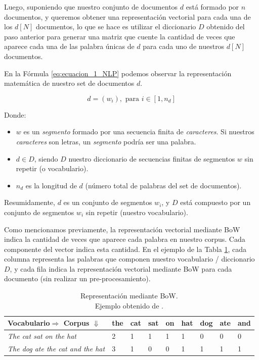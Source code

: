 \documentclass[12pt,a4paper]{article}
\begin{document}
\begin{sloppypar}
Luego, suponiendo que nuestro conjunto de documentos $d$  está formado por $n$ documentos, y queremos obtener una representación vectorial para cada una de los $d[N]$ documentos, lo que se hace es utilizar el diccionario $D$ obtenido del paso anterior para generar una matriz que cuente la cantidad de veces que aparece cada una de las palabra únicas de $d$ para cada uno de nuestros $d[N]$ documentos.

En la Fórmula \ref{eq:ecuacion_1_NLP} podemos observar la representación matemática de nuestro set de documentos  $d$.

\begin{equation}\label{eq:ecuacion_1_NLP}
d = (w_i),      \text{    para  } i\in[1,n_d] 
\end{equation}

Donde:
\begin{itemize}
\item $w$ es un \textit{segmento} formado por una secuencia finita de \textit{caracteres}. Si nuestros \textit{caracteres} son letras, un \textit{segmento} podría ser una palabra.
\item $d \in D$, siendo $D$ nuestro diccionario de secuencias finitas de segmentos $w$ sin repetir (o vocabulario). 
\item $n_d$ es la longitud de $d$ (número total de palabras del set de documentos).
\end{itemize}

Resumidamente, $d$ es un conjunto de segmentos $w_i$, y $D$ está compuesto por un conjunto de segmentos $w_i$ sin repetir (nuestro vocabulario).

\cleardoublepage

Como mencionamos previamente, la representación vectorial mediante BoW indica la cantidad de veces que aparece cada palabra en nuestro corpus. Cada componente del vector indica esta cantidad. En el ejemplo de la Tabla \ref{table:bow_1}, cada columna representa las palabras que componen nuestro vocabulario / diccionario $D$, y cada fila indica la representación vectorial mediante BoW para cada documento (sin realizar un pre-procesamiento).

\begin{table}[h!]
\centering
\begin{tabular}{|p{4cm}||p{1cm}|p{1cm}|p{1cm}|p{1cm}|p{1cm}|p{1cm}|p{1cm}|p{1cm}|}
\hline
\textbf{Vocabulario$\Rightarrow$ Corpus $\Downarrow$} & the & cat & sat & on & hat & dog & ate & and \\ [1ex] 
\hline
\textit{The cat sat on the hat} & 2 & 1 & 1 & 1 & 1 & 0 & 0 & 0 \\ 
\hline
\textit{The dog ate the cat and the hat} & 3 & 1 & 0 & 0 & 1 & 1 & 1 & 1 \\ 
\hline
\end{tabular}
\caption{Representación mediante BoW. \\ Ejemplo obtenido de \cite{NLP_8}.} 
\label{table:bow_1}
\end{table}


\end{sloppypar}
\end{document}
